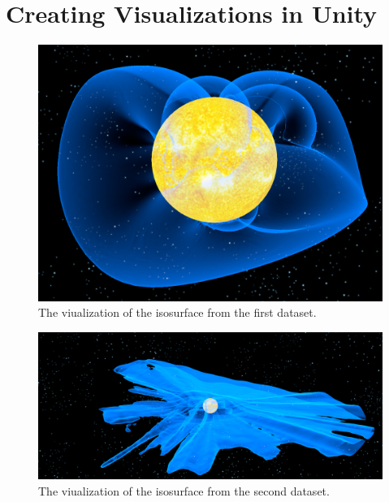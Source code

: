 \documentclass[a4paper,10pt]{report}
\begin{document}
\chapter{Creating Visualizations in Unity}
\begin{figure}[H]
    \centering
    \includegraphics[width=\textwidth]{../images/3D/Dataset1_Unity.png}
    \caption{The viualization of the isosurface from the first dataset.}
    \label{fig:Dataset1_Unity}
\end{figure}
\begin{figure}[H]
    \centering
    \includegraphics[width=\textwidth]{../images/3D/Dataset2_Unity.png}
    \caption{The viualization of the isosurface from the second dataset.}
    \label{fig:Dataset2_Unity}
\end{figure}
\end{document}
